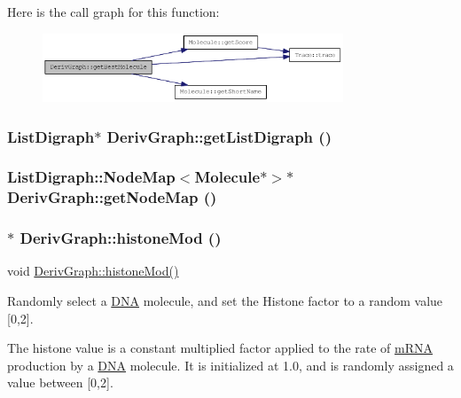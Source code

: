Here is the call graph for this function:\nopagebreak
\begin{figure}[H]
\begin{center}
\leavevmode
\includegraphics[width=254pt]{classDerivGraph_aaaa9598e55cbd8c55585a0488e940516_cgraph}
\end{center}
\end{figure}
\hypertarget{classDerivGraph_ae657edb3b0bf358f75f498a2d56e0456}{
\subsubsection[{getListDigraph}]{\setlength{\rightskip}{0pt plus 5cm}ListDigraph$\ast$ DerivGraph::getListDigraph ()}}
\label{classDerivGraph_ae657edb3b0bf358f75f498a2d56e0456}
\hypertarget{classDerivGraph_a41cea20de6fd631deeb82f036bc823f4}{
\subsubsection[{getNodeMap}]{\setlength{\rightskip}{0pt plus 5cm}ListDigraph::NodeMap$<${\bf Molecule}$\ast$$>$$\ast$ DerivGraph::getNodeMap ()}}
\label{classDerivGraph_a41cea20de6fd631deeb82f036bc823f4}
\hypertarget{classDerivGraph_ae39d9acba4901f668d8a85c88bfcc21a}{
\subsubsection[{histoneMod}]{ $\ast$ DerivGraph::histoneMod ()}}
\label{classDerivGraph_ae39d9acba4901f668d8a85c88bfcc21a}
void \hyperlink{classDerivGraph_ae39d9acba4901f668d8a85c88bfcc21a}{DerivGraph::histoneMod()}

Randomly select a \hyperlink{classDNA}{DNA} molecule, and set the Histone factor to a random value \mbox{[}0,2\mbox{]}.

The histone value is a constant multiplied factor applied to the rate of \hyperlink{classmRNA}{mRNA} production by a \hyperlink{classDNA}{DNA} molecule. It is initialized at 1.0, and is randomly assigned a value between \mbox{[}0,2\mbox{]}.

